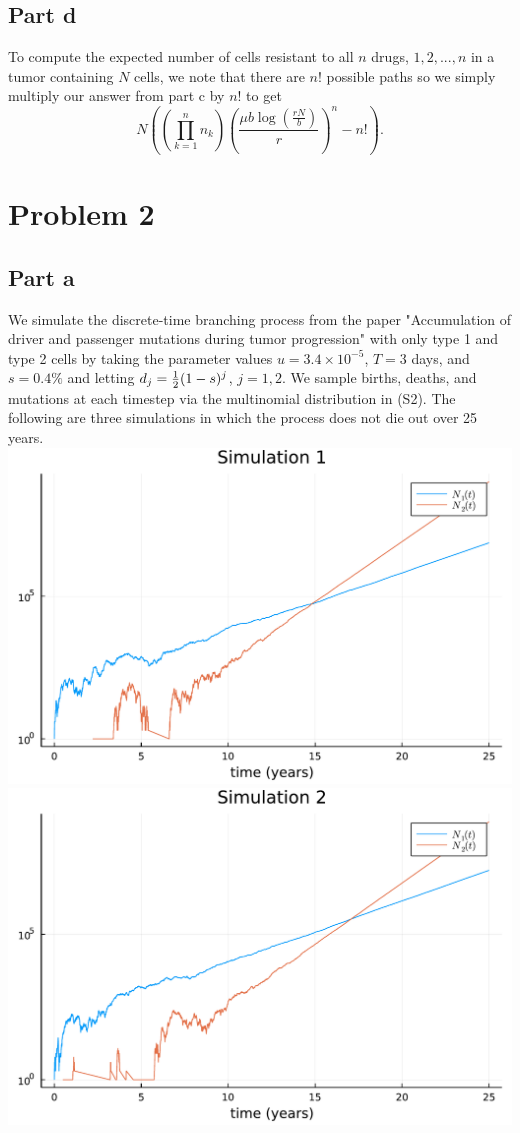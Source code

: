 \documentclass{article}
\begin{document}
\subsection{Part d}
To compute the expected number of cells resistant to all $n$ drugs, $1, 2, ...,n$ in a tumor containing $N$ cells, we note that there are $n!$ possible paths so we simply multiply our answer from part c by $n!$ to get
\[
N\left(\left(\prod_{k=1}^{n}n_k\right)\left(\frac{\mu b\log\left(\frac{rN}{b}\right)}{r}\right)^n-n!\right).
\]

\section{Problem 2}
\subsection{Part a}
We simulate the discrete-time branching process from the paper "Accumulation of driver and passenger mutations during tumor progression" with only type 1 and type 2 cells by taking the parameter values $u=3.4\times10^{-5}$, $T= 3$ days, and $s=0.4\%$ and letting $d_j=\mbox{$\frac{1}{2}$}(1-s)^j$, $j=1,2$. We sample births, deaths, and mutations at each timestep via the multinomial distribution in (S2). The following are three simulations in which the process does not die out over 25 years. \\
\includegraphics[scale=0.5]{sim1.pdf}\\
\includegraphics[scale=0.5]{sim2.pdf}\\
\end{document}
